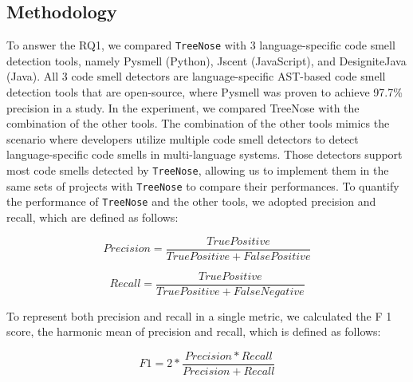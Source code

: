 


\subsection{Methodology}
\label{sec:methodology}

To answer the RQ1, we compared \texttt{TreeNose} with 3 language-specific code smell detection tools, namely Pysmell \cite{Pysmell}
(Python), Jscent \cite{Jscent} (JavaScript), and DesigniteJava \cite{DesigniteJava} (Java).
All 3 code smell detectors are language-specific AST-based code smell detection tools 
that are open-source, where Pysmell was proven to achieve 97.7\% precision in a study.
In the experiment, we compared TreeNose with the combination of the other tools.
The combination of the other tools mimics the scenario where developers utilize multiple code smell detectors to detect language-specific code smells in multi-language systems.
Those detectors support most code smells detected by \texttt{TreeNose}, allowing us to implement them in the same sets of projects with \texttt{TreeNose} to compare their performances.
To quantify the performance of \texttt{TreeNose} and the other tools, we adopted precision and recall, which are defined as follows:


\begin{equation}
    Precision = \frac{True Positive}{True Positive + False Positive}
\end{equation}

\begin{equation}
    Recall = \frac{True Positive}{True Positive + False Negative}
\end{equation}

To represent both precision and recall in a single metric, we calculated the F 1 score, the harmonic mean of precision and recall, which is defined as follows:

\begin{equation}
    F1 = 2 * \frac{Precision * Recall}{Precision + Recall}
\end{equation}

